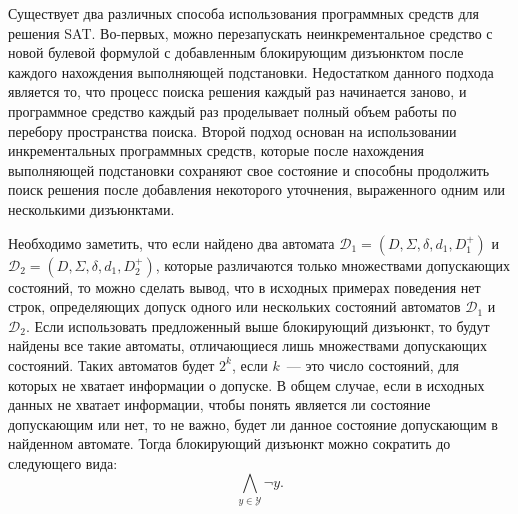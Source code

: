Существует два различных способа использования программных средств для решения SAT.
Во-первых, можно перезапускать неинкрементальное средство с новой булевой формулой с добавленным блокирующим дизъюнктом после каждого нахождения выполняющей подстановки.
Недостатком данного подхода является то, что процесс поиска решения каждый раз начинается заново, и программное средство каждый раз проделывает полный объем работы по перебору пространства поиска.
Второй подход основан на использовании инкрементальных программных средств, которые после нахождения выполняющей подстановки сохраняют свое состояние и способны продолжить поиск решения после добавления некоторого уточнения, выраженного одним или несколькими дизъюнктами.


Необходимо заметить, что если найдено два автомата $\mathcal{D}_1 = \left(D,\Sigma,\delta,d_{1},D_{1}^{+}\right)$ и $\mathcal{D}_2 = \left(D,\Sigma,\delta,d_{1},D_{2}^{+}\right)$, которые различаются только множествами допускающих состояний, то можно сделать вывод, что в исходных примерах поведения нет строк, определяющих допуск одного или нескольких состояний автоматов $\mathcal{D}_{1}$ и $\mathcal{D}_{2}$.
Если использовать предложенный выше блокирующий дизъюнкт, то будут найдены все такие автоматы, отличающиеся лишь множествами допускающих состояний.
Таких автоматов будет $2^{k}$, если $k$~{---} это число состояний, для которых не хватает информации о допуске.
В общем случае, если в исходных данных не хватает информации, чтобы понять является ли состояние допускающим или нет, то не важно, будет ли данное состояние допускающим в найденном автомате.
Тогда блокирующий дизъюнкт можно сократить до следующего вида:
\begin{equation*}
\bigwedge_{y \in \mathcal{Y}} \neg y.
\end{equation*}


